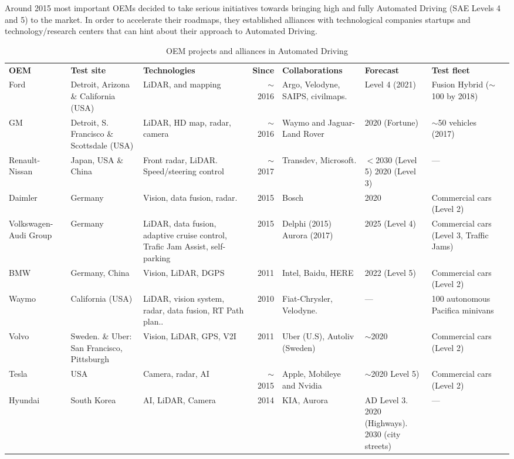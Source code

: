 \documentclass[journal]{IEEEtran}
\newcommand{\ra}[1]{\renewcommand{\arraystretch}{#1}}
\begin{document}
Around 2015 most important OEMs decided to take serious initiatives towards
bringing high and fully Automated Driving (SAE Levels 4 and 5) to the market.
In order to accelerate their roadmaps, they established alliances with
technological companies startups and technology/research centers that
can hint about their approach to Automated Driving.

\begin{table}%
	\ra{1.3}
	\caption{OEM projects and alliances in Automated Driving}
	\label{tab:oem-ad}
	\begin{tabular}{@{}p{1.5cm}p{2.5cm}p{3.0cm}r*{2}{p{2.5cm}}p{2cm}p{3cm}@{}} 
		\toprule
		\textbf{OEM} & \textbf{Test site} & \textbf{Technologies} &
		\textbf{Since} & \textbf{Collaborations} & \textbf{Forecast} & 
		\textbf{Test fleet} 
		\\    
		\cmidrule(r{4pt}){1-1} \cmidrule(l){2-7}
		Ford & Detroit, Arizona \& California (USA) & LiDAR, and mapping  & 
		$\sim$2016 & Argo, Velodyne, SAIPS, civilmaps. & Level 4 (2021) & 
		Fusion Hybrid ($\sim$100 by 2018)
		\\
		GM & Detroit, S. Francisco \& Scottsdale (USA) & LiDAR, 
		HD map, radar, camera & $\sim$2016 & Waymo and 
		Jaguar-Land Rover & 2020 (Fortune) & $\sim$50 vehicles (2017) 
		\\
		Renault-Nissan & Japan, USA \& China & Front radar, LiDAR. 
		Speed/steering control & $\sim$2017 & Transdev, Microsoft. & 
		\parbox[t][][t]{2cm}{$<$2030 (Level 5)\\ 2020 (Level 3)} 
		& --- 
		\\
		Daimler & Germany & Vision, data fusion, radar. & 2015 & 
		Bosch & 2020 & Commercial cars (Level 2) 
		\\
		Volkswagen-Audi Group & Germany & LiDAR, data fusion, adaptive cruise 
		control, Trafic Jam Assist, self-parking & 2015 & 
		\parbox[t][][t]{2.2cm}{Delphi (2015) \\ Aurora (2017)} & 2025 (Level 4) 
		& Commercial cars (Level 3, Traffic Jams) 
		\\ 
		BMW & Germany, China & Vision, LiDAR, DGPS & 2011 & Intel, Baidu, HERE 
		& 2022 (Level 5) & 
		Commercial cars (Level 2) 
		\\
		Waymo & California (USA) & LiDAR, vision system, radar, data fusion, 
		RT 
		Path plan.. & 2010 & Fiat-Chrysler,  Velodyne. & --- & 100 autonomous 
		Pacifica minivans  
		\\
		Volvo & Sweden. \& Uber: San Francisco, Pittsburgh  & Vision, LiDAR, 
		GPS, 
		V2I & 2011 & Uber (U.S), Autoliv (Sweden)  & $\sim$2020 & Commercial 
		cars 
		(Level 2) 
		\\
		Tesla & USA & Camera, radar, AI & $\sim$2015 & Apple, Mobileye and 
		Nvidia 
		& 
		$\sim$2020 Level 5)  & Commercial cars (Level 2) \\
		Hyundai & South Korea & AI, LiDAR, Camera & 2014 & KIA, Aurora & 
		\parbox[t][][t]{2.2cm}{AD Level 3.\\2020 (Highways).\\2030 (city 
			streets)} & --- 
		\\
		\bottomrule  
	\end{tabular}
\end{table}
\end{document}
